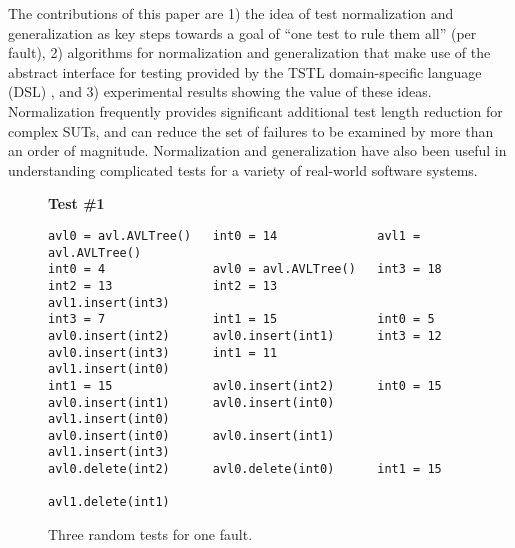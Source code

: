 The contributions of this paper are 1) the idea of test normalization and
generalization as key steps towards a goal of
``one test to rule them all'' (per fault), 2) algorithms for
normalization and generalization that make use of the abstract
interface for testing provided by the TSTL \cite{tstl,NFM15,ISSTA15,tstlsttt}
domain-specific language (DSL) \cite{Fow10}, and 3)
experimental results showing the value of these ideas.  Normalization frequently provides significant additional test length
reduction for complex SUTs, and can reduce
the set of failures to be examined by more than an order of
magnitude.  Normalization and generalization have also been useful in
understanding complicated tests for a variety of real-world software
systems.

\begin{figure}[t]
{\scriptsize
\raggedright
{\bf Test \#1}\hspace{.7in}{\bf Test \#2} \hspace{0.65in}{\bf Test \#3}
\begin{verbatim}
avl0 = avl.AVLTree()   int0 = 14              avl1 = avl.AVLTree()
int0 = 4               avl0 = avl.AVLTree()   int3 = 18 
int2 = 13              int2 = 13              avl1.insert(int3) 
int3 = 7               int1 = 15              int0 = 5 
avl0.insert(int2)      avl0.insert(int1)      int3 = 12 
avl0.insert(int3)      int1 = 11              avl1.insert(int0) 
int1 = 15              avl0.insert(int2)      int0 = 15 
avl0.insert(int1)      avl0.insert(int0)      avl1.insert(int0) 
avl0.insert(int0)      avl0.insert(int1)      avl1.insert(int3) 
avl0.delete(int2)      avl0.delete(int0)      int1 = 15 
                                              avl1.delete(int1) 
\end{verbatim}
}
\caption {{Three random tests for one fault.}}
\label{threetests}
\end{figure}

